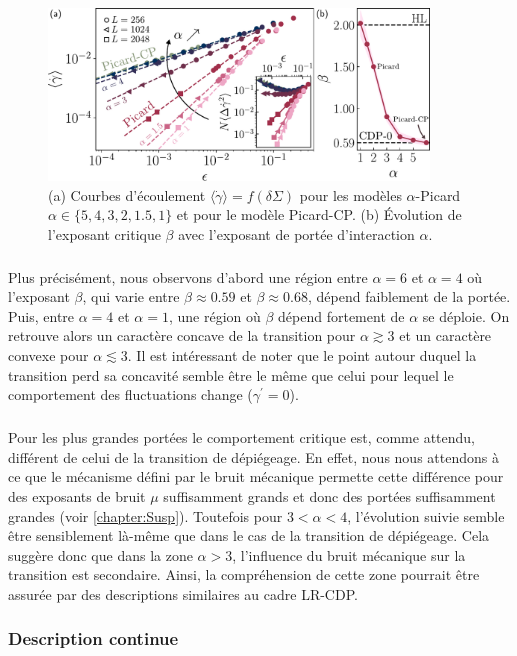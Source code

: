 \begin{figure}[h]
	\centering
	\includegraphics[width=0.9\textwidth]{Chapitre4/Figures/LonguePortee/alphaPicard.pdf}
	\caption{(a) Courbes d'écoulement $\langle\dot{\gamma}\rangle = f(\delta\Sigma)$ pour les modèles $\alpha$-Picard $\alpha \in \{5, 4, 3, 2, 1.5, 1\}$ et pour le modèle Picard-CP.
(b) Évolution de l'exposant critique $\beta$ avec l'exposant de portée d'interaction $\alpha$.}
	\label{fig:PLVar_EPM}
\end{figure}

\subparagraph{}Plus précisément, nous observons d'abord une région entre $\alpha = 6$ et $\alpha = 4$ où l'exposant $\beta$, qui varie entre $\beta \approx 0.59$ et $\beta \approx 0.68$, dépend faiblement de la portée. Puis, entre $\alpha = 4$ et $\alpha=1$, une région où $\beta$ dépend fortement de $\alpha$ se déploie. On retrouve alors un caractère concave de la transition pour $\alpha \gtrsim 3$ et un caractère convexe pour $\alpha \lesssim 3$. Il est intéressant de noter que le point autour duquel la transition perd sa concavité semble être le même que celui pour lequel le comportement des fluctuations change ($\gamma^\prime = 0$). 

\subparagraph{}Pour les plus grandes portées le comportement critique est, comme attendu, différent de celui de la transition de dépiégeage. En effet, nous nous attendons à ce que le mécanisme défini par le bruit mécanique permette cette différence pour des exposants de bruit $\mu$ suffisamment grands et donc des portées suffisamment grandes (voir \autoref{chapter:Susp}). Toutefois pour $3<\alpha<4$, l'évolution suivie semble être sensiblement là-même que dans le cas de la transition de dépiégeage. Cela suggère donc que dans la zone $\alpha > 3$, l'influence du bruit mécanique sur la transition est secondaire. Ainsi, la compréhension de cette zone pourrait être assurée par des descriptions similaires au cadre LR-CDP.

\subsubsection{Description continue}

